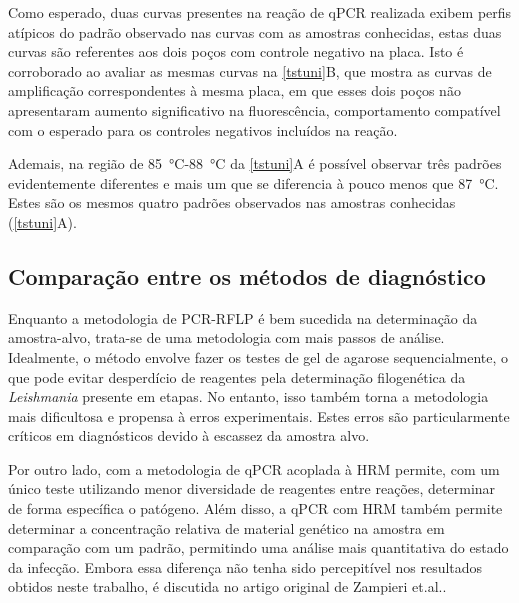 Como esperado, duas curvas presentes na reação de qPCR realizada exibem perfis
atípicos do padrão observado nas curvas com as amostras conhecidas, estas duas
curvas são referentes aos dois poços com controle negativo na placa. Isto é
corroborado ao avaliar as mesmas curvas na \cref{tstuni}B, que mostra as curvas
de amplificação correspondentes à mesma placa, em que esses dois poços não
apresentaram aumento significativo na fluorescência, comportamento compatível
com o esperado para os controles negativos incluídos na reação.

Ademais, na região de \qty{85}{\celsius}-\qty{88}{\celsius} da \cref{tstuni}A é
possível observar três padrões evidentemente diferentes e mais um que se
diferencia à pouco menos que \qty{87}{\celsius}. Estes são os mesmos quatro
padrões observados nas amostras conhecidas (\cref{tstuni}A).

\subsection{Comparação entre os métodos de diagnóstico}
Enquanto a metodologia de PCR-RFLP é bem sucedida na determinação da
amostra-alvo, trata-se de uma metodologia com mais passos de análise.
Idealmente, o método envolve fazer os testes de gel de agarose sequencialmente,
o que pode evitar desperdício de reagentes pela determinação filogenética da
\textit{Leishmania} presente em etapas. No entanto, isso também torna a
metodologia mais dificultosa e propensa à erros experimentais. Estes erros são
particularmente críticos em diagnósticos devido à escassez da amostra alvo. 

Por outro lado, com a metodologia de qPCR acoplada à HRM permite, com um único
teste utilizando menor diversidade de reagentes entre reações, determinar de
forma específica o  patógeno. Além disso, a qPCR com HRM também permite
determinar a concentração relativa de material genético na amostra em comparação
com um padrão, permitindo uma análise mais quantitativa do estado da infecção. Embora essa diferença não tenha sido percepitível nos resultados obtidos neste
trabalho, é discutida no artigo original de Zampieri et.al.\cite{HRMzampi2016}.
